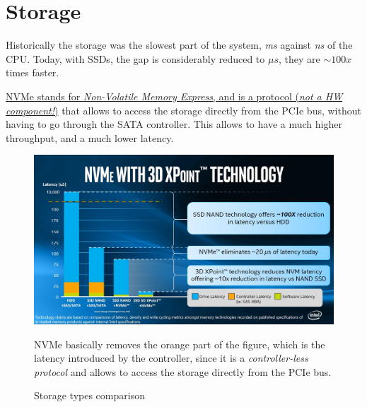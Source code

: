 \chapter{Storage}


\begin{paracol}{2}
   
   Historically the storage was the slowest part of the system, \textit{ms} against \textit{ns} of the CPU.
   Today, with SSDs, the gap is considerably reduced to \textit{$\mu s$}, they are $\sim 100x$ times faster.
   
   \ul{NVMe stands for \textit{Non-Volatile Memory Express}, and is a protocol (\textit{not a HW component!})} that allows to access the storage directly from the PCIe bus, without having to go through the SATA controller. This allows to have a much higher throughput, and a much lower latency.

   \switchcolumn

   \begin{figure}[htbp]
      \centering
      \includegraphics{images/storage_intel.jpg}
      \caption{Storage types comparison}
      \label{fig:storage_intel}
      NVMe basically removes the orange part of the figure, which is the latency introduced by the controller, since it is a \textit{controller-less protocol} and allows to access the storage directly from the PCIe bus.
   \end{figure}
\end{paracol}


